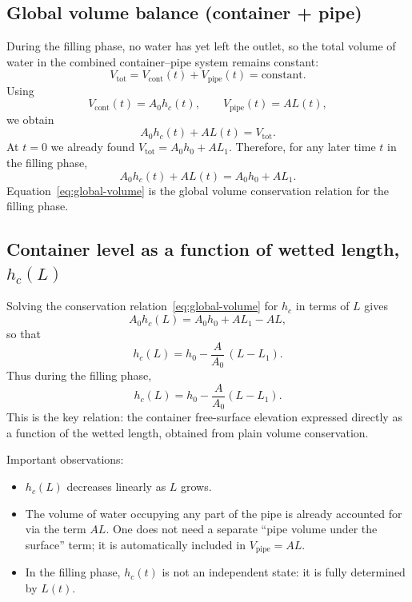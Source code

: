 \documentclass[11pt]{article}
\begin{document}
\subsection{Global volume balance (container + pipe)}

During the filling phase, no water has yet left the outlet, so the total volume of water in the
combined container--pipe system remains constant:
\[
  V_{\text{tot}} = V_{\text{cont}}(t) + V_{\text{pipe}}(t) = \text{constant}.
\]
Using
\[
  V_{\text{cont}}(t) = A_0 h_c(t),\qquad
  V_{\text{pipe}}(t) = A L(t),
\]
we obtain
\[
  A_0 h_c(t) + A L(t) = V_{\text{tot}}.
\]
At $t = 0$ we already found $V_{\text{tot}} = A_0 h_0 + A L_1$. Therefore, for any later time
$t$ in the filling phase,
\begin{equation}
  A_0 h_c(t) + A L(t) = A_0 h_0 + A L_1.
  \label{eq:global-volume}
\end{equation}
Equation~\eqref{eq:global-volume} is the global volume conservation relation for the filling phase.

\subsection{Container level as a function of wetted length, $h_c(L)$}

Solving the conservation relation~\eqref{eq:global-volume} for $h_c$ in terms of $L$ gives
\[
  A_0 h_c(L) = A_0 h_0 + A L_1 - A L,
\]
so that
\[
  h_c(L) = h_0 - \frac{A}{A_0}\,(L - L_1).
\]
Thus during the filling phase,
\begin{equation}
  h_c(L) = h_0 - \frac{A}{A_0}(L - L_1).
  \label{eq:hc-of-L}
\end{equation}
This is the key relation: the container free-surface elevation expressed directly as a function
of the wetted length, obtained from plain volume conservation.

Important observations:
\begin{itemize}
  \item $h_c(L)$ decreases linearly as $L$ grows.
  \item The volume of water occupying any part of the pipe is already accounted for via the
        term $A L$. One does not need a separate ``pipe volume under the surface'' term;
        it is automatically included in $V_{\text{pipe}} = A L$.
  \item In the filling phase, $h_c(t)$ is not an independent state: it is fully determined by
        $L(t)$.
\end{itemize}
\end{document}

